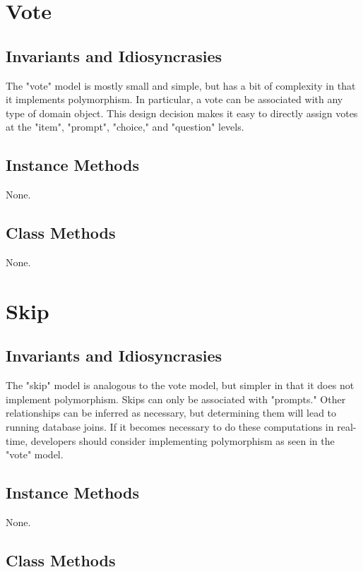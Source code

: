 \documentclass[11pt]{book}
\begin{document}
\section{Vote}

\subsection{Invariants and Idiosyncrasies}

The "vote" model is mostly small and simple, but has a bit of complexity in that it implements polymorphism.  In particular, a vote can be associated with any type of domain object.  This design decision makes it easy to directly assign votes at the "item", "prompt", "choice," and "question" levels.

\subsection{Instance Methods}

None.


\subsection{Class Methods}

None.

\section{Skip}

\subsection{Invariants and Idiosyncrasies}

The "skip" model is analogous to the vote model, but simpler in that it does not implement polymorphism.  Skips can only be associated with "prompts."  Other relationships can be inferred as necessary, but determining them will lead to running database joins.  If it becomes necessary to do these computations in real-time, developers should consider implementing polymorphism as seen in the "vote" model.


\subsection{Instance Methods}

None.


\subsection{Class Methods}
\end{document}
